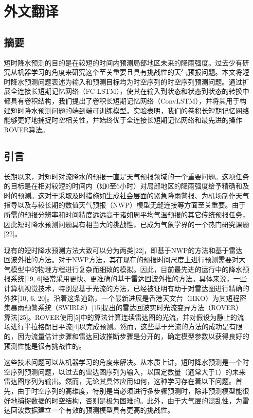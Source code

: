\cleardoublepage
\chapter{外文翻译}
\section*{摘要}
\par 短时降水预测的目的是在较短的时间内预测局部地区未来的降雨强度。过去少有研究从机器学习的角度来研究这个至关重要且具有挑战性的天气预报问题。本文将短时降水预测问题表述为输入和预测目标均为时空序列的时空序列预测问题。通过扩展全连接长短期记忆网络（FC-LSTM），使其在输入到状态和状态到状态的转换中都具有卷积结构，我们提出了卷积长短期记忆网络（ConvLSTM），并将其用于构建短时降水预测问题的端到端可训练模型。实验表明，我们的卷积长短期记忆网络能够更好地捕捉时空相关性，并始终优于全连接长短期记忆网络和最先进的操作ROVER算法。

\section{引言}
\par 长期以来，对短时对流降水的预报一直是天气预报领域的一个重要问题。这项任务的目标是在相对较短的时间内（如0至6小时）对局部地区的降雨强度给予精确和及时的预测。这对于采取及时措施如生成社会层面的紧急降雨警报、为机场制作天气指导以及与较长期的数值天气预报（NWP）模型无缝连接等方面至关重要。由于所需的预报分辨率和时间精度远远高于诸如周平均气温预报的其它传统预报任务，因此短时降水预测问题具有相当大的挑战性，已成为气象学界的一个热门研究课题[22]。

\par 现有的短时降水预测方法大致可以分为两类[22]，即基于NWP的方法和基于雷达回波外推的方法。对于NWP方法，其在现在的预报时间尺度上进行预测需要对大气模型中的物理方程进行复杂而细致的模拟。因此，目前最先进的运行中的降水预报系统[19, 6]经常采用更快、更准确的基于雷达回波外推的方法。具体来说，一些计算机视觉技术，特别是基于光流的方法，已经被证明有助于对雷达图进行精确的外推[10, 6, 20]。沿着这条道路，一个最新进展是香港天文台（HKO）为其短程密集暴雨预警系统（SWIRLS）[15]提出的雷达回波实时光流变异方法（ROVER）算法[25]。ROVER使用[5]中的算法计算连续雷达图的光流，并对假设为静止的流场进行半拉格朗日平流[4]以完成预测。然而，这些基于光流的方法的成功是有限的，因为流量估计步骤和雷达回波推断步骤是分开的，确定模型参数以获得良好的预测性能是很有挑战性的。

\par 这些技术问题可以从机器学习的角度来解决。从本质上讲，短时降水预测是一个时空序列预测问题，以过去的雷达图序列为输入，以固定数量（通常大于1）的未来雷达图序列为输出。然而，无论其具体应用如何，这种学习存在着以下问题。首先，由于时空序列的高维度，特别是当必须进行多步骤预测时，除非预测模型能很好地捕捉数据的时空结构，否则是极为困难的。此外，由于大气层的混乱性，为雷达回波数据建立一个有效的预测模型具有更高的挑战性。

